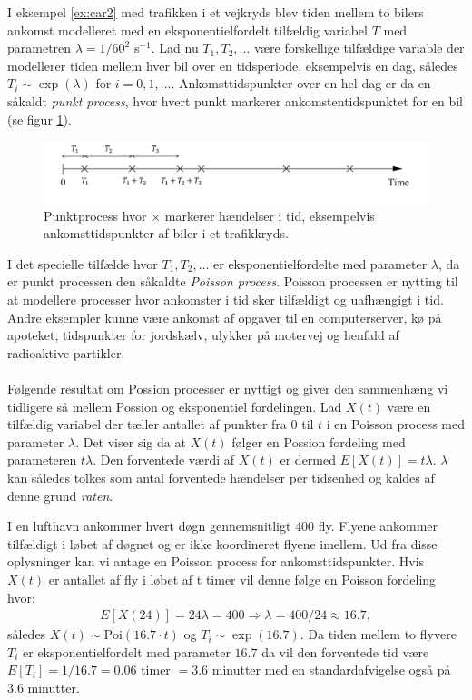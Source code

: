 I eksempel \ref{ex:car2} med trafikken i et vejkryds blev tiden mellem to bilers ankomst modelleret med en eksponentielfordelt tilfældig variabel $T$ med parametren $\lambda = 1/60^2$ s$^{-1}$. Lad nu $T_1, T_2, \dots$ være forskellige tilfældige variable der modellerer tiden mellem hver bil over en tidsperiode, eksempelvis en dag, således $T_i \sim \exp(\lambda)$ for $i = 0,1,\dots$. Ankomsttidspunkter over en hel dag er da en såkaldt \emph{punkt process}, hvor hvert punkt markerer ankomstentidspunktet for en bil (se figur \ref{fig:process1}).
\begin{figure}[H]
\centering
\includegraphics[width = \textwidth]{process1.png}
\caption{Punktprocess hvor $\times$ markerer hændelser i tid, eksempelvis ankomsttidspunkter af biler i et trafikkryds.} \label{fig:process1}
\end{figure}
I det specielle tilfælde hvor $T_1, T_2, \dots$ er eksponentielfordelte med parameter $\lambda$, da er punkt processen den såkaldte \emph{Poisson process}. Poisson processen er nytting til at modellere processer hvor ankomster i tid sker tilfældigt og uafhængigt i tid. Andre eksempler kunne være ankomst af opgaver til en computerserver, kø på apoteket, tidspunkter for jordskælv, ulykker på motervej og henfald af radioaktive partikler.
\\ \\  
Følgende resultat om Possion processer er nyttigt og giver den sammenhæng vi tidligere så mellem Possion og eksponentiel fordelingen. Lad $X(t)$ være en tilfældig variabel der tæller antallet af punkter fra $0$ til $t$ i en Poisson process med parameter $\lambda$. Det viser sig da at $X(t)$ følger en Possion fordeling med parameteren $t \lambda $. Den forventede værdi af $X(t)$ er dermed $E[X(t)] = t \lambda$. $\lambda$ kan således tolkes som antal forventede hændelser per tidsenhed og kaldes af denne grund \emph{raten}. 
\begin{example}
I en lufthavn ankommer hvert døgn gennemsnitligt $400$ fly. Flyene ankommer tilfældigt i løbet af døgnet og er ikke koordineret flyene imellem. Ud fra disse oplysninger kan vi antage en Poisson process for ankomsttidspunkter. Hvis $X(t)$ er antallet af fly i løbet af t timer vil denne følge en Poisson fordeling hvor:
\begin{align*}
E[X(24)] = 24\lambda = 400 \Rightarrow \lambda = 400/24 \approx 16.7,
\end{align*}
således $X(t) \sim \text{Poi}(16.7\cdot t)$ og $T_i \sim \exp(16.7)$. Da tiden mellem to flyvere $T_i$ er eksponentielfordelt med parameter $16.7$ da vil den forventede tid være $E[T_i] = 1/16.7 = 0.06$ timer $= 3.6$ minutter med en standardafvigelse også på $3.6$ minutter. 
\end{example}

